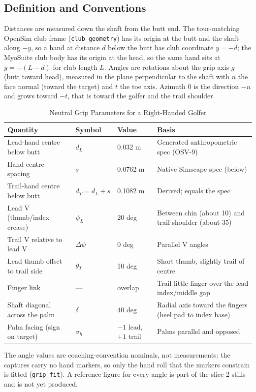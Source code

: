 \documentclass[11pt,a4paper]{article}
\begin{document}
\subsection{Definition and Conventions}
Distances are measured down the shaft from the butt end. The tour-matching
OpenSim club frame (\texttt{club\_geometry}) has its origin at the butt and the
shaft along $-y$, so a hand at distance $d$ below the butt has club coordinate
$y=-d$; the MyoSuite club body has its
origin at the head, so the same hand sits at $y=-(L-d)$ for club length $L$.
Angles are rotations about the grip axis $g$ (butt toward head), measured in
the plane perpendicular to the shaft with $n$ the face normal (toward the
target) and $t$ the toe axis. Azimuth $0$ is the direction $-n$ and grows
toward $-t$, that is toward the golfer and the trail shoulder.

\begin{table}[h]
\centering
\begin{tabular}{llll}
\hline
Quantity & Symbol & Value & Basis \\
\hline
Lead-hand centre below butt & $d_L$ & 0.032 m & Generated anthropometric spec (OSV-9) \\
Hand-centre spacing & $s$ & 0.0762 m & Native Simscape spec (below) \\
Trail-hand centre below butt & $d_T=d_L+s$ & 0.1082 m & Derived; equals the spec \\
Lead V (thumb/index crease) & $\psi_L$ & 20 deg & Between chin (about 10) and trail shoulder (about 35) \\
Trail V relative to lead V & $\Delta\psi$ & 0 deg & Parallel V angles \\
Lead thumb offset to trail side & $\theta_T$ & 10 deg & Short thumb, slightly trail of centre \\
Finger link & --- & overlap & Trail little finger over the lead index/middle gap \\
Shaft diagonal across the palm & $\delta$ & 40 deg & Radial axis toward the fingers (heel pad to index base) \\
Palm facing (sign on target) & $\sigma_h$ & $-1$ lead, $+1$ trail & Palms parallel and opposed \\
\hline
\end{tabular}
\caption{Neutral Grip Parameters for a Right-Handed Golfer}
\end{table}

The angle values are coaching-convention nominals, not measurements: the
captures carry no hand markers, so only the hand roll that the markers
constrain is fitted (\texttt{grip\_fit}). A reference figure for every angle
is part of the slice-2 stills and is not yet produced.
\end{document}
